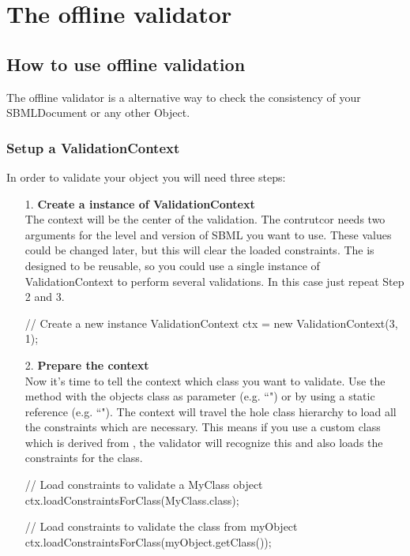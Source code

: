 \section[Offline validation]{The offline validator}
\subsection{How to use offline validation}

The offline validator is a alternative way to check the consistency of your SBMLDocument or any other Object.
\subsubsection{Setup a ValidationContext}
In order to validate your object you will need three steps:
\begin{itemize}
\item[1.] \textbf{Create a instance of ValidationContext} \\
The context will be the center of the validation. The contrutcor needs two arguments for the level and version of SBML you want to use. These values could be changed later, but this will clear the loaded constraints. The  is designed to be reusable, so you could use a single instance of ValidationContext to perform several validations. In this case just repeat Step 2 and 3.
\begin{example}[style=java, title={Setup a ValidationContext}]
	// Create a new instance
	ValidationContext ctx = new ValidationContext(3, 1);
\end{example}
\item[2.] \textbf{Prepare the context} \\
Now it's time to tell the context which class you want to validate. Use the method  with the objects class as parameter (e.g. ``") or by using a static reference (e.g. ``"). The context will travel the hole class hierarchy to load all the constraints which are necessary. This means if you use a custom class which is derived from \Species, the validator will recognize this and also loads the constraints for the \Species class.
\begin{example}[style=java, title={Three different ways to load constraints}]
	// Load constraints to validate a MyClass object
	ctx.loadConstraintsForClass(MyClass.class);	
	
	// Load constraints to validate the class from myObject
	ctx.loadConstraintsForClass(myObject.getClass());
	

\end{example}
\end{itemize}
